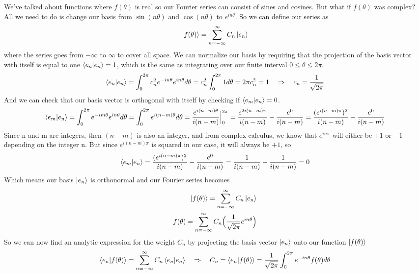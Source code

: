 \documentclass{article}
\newcommand{\be}{\begin{equation}}
\newcommand{\ee}{\end{equation}}
\begin{document}
We've talked about functions where $f(\theta)$ is real so our Fourier series can consist of sines and cosines.
But what if $f(\theta)$ was complex?
All we need to do is change our basis from $\sin(n \theta)$ and $\cos(n \theta)$ to $e^{i n \theta}$.
So we can define our series as
\be
  \ket{f(\theta)} = \sum_{n= - \infty}^{\infty} C_n \ket{e_n}
\ee
where the series goes from $- \infty$ to $\infty$ to cover all space.
We can normalize our basis by requiring that the projection of the basis vector with itself is equal to one $\braket{e_n|e_n} = 1$, which is the same as integrating over our finite interval $0 \leq \theta \leq 2 \pi$.
\be
  \braket{e_n | e_n} = \int_{0}^{2 \pi} c_n^2 e^{-i n \theta} e^{i n \theta} d \theta = c_n^2 \int_{0}^{2 \pi} 1 d \theta = 2 \pi c_n^2 = 1 \quad \Rightarrow \quad c_n = \frac{1}{\sqrt{2 \pi}}
\ee
And we can check that our basis vector is orthogonal with itself by checking if $\braket{e_m|e_n} = 0$.
\be
  \braket{e_m|e_n} = \int_0^{2 \pi} e^{- i m \theta} e^{i n \theta} d \theta = \int_0^{2 \pi} e^{i (n - m) \theta} d\theta = \frac{e^{i (n - m) \theta}}{i (n - m)} \Big|_0^{2 \pi} = \frac{e^{2 i (n - m) \pi}}{i (n - m)} - \frac{e^{0}}{i (n - m)} = \frac{(e^{ i (n - m) \pi})^2}{i (n - m)} - \frac{e^{0}}{i (n - m)}
\ee
Since n and m are integers, then $(n-m)$ is also an integer, and from complex calculus, we know that $e^{i n \pi}$ will either be $+1$ or $-1$ depending on the integer n.
But since $e^{ i (n - m) \pi}$ is squared in our case, it will always be $+1$, so
\be
  \braket{e_m|e_n} = \frac{(e^{ i (n - m) \pi})^2}{i (n - m)} - \frac{e^{0}}{i (n - m)} = \frac{1}{i (n - m)} - \frac{1}{i (n - m)} = 0
\ee
Which means our basis $\ket{e_n}$ is orthonormal and our Fourier series becomes
\be
  \begin{split}
    \ket{f(\theta)} = \sum_{n= - \infty}^{\infty} C_n \ket{e_n} \\
    f(\theta) = \sum_{n= - \infty}^{\infty} C_n \Big( \frac{1}{\sqrt{2 \pi}} e^{i n \theta} \Big)
  \end{split}
\ee
So we can now find an analytic expression for the weight $C_n$ by projecting the basis vector $\ket{e_n}$ onto our function $\ket{f(\theta)}$
\be
  \braket{e_n|f(\theta)} = \sum_{n= - \infty}^{\infty} C_n \braket{e_n|e_n} \quad \Rightarrow \quad C_n = \braket{e_n|f(\theta)} = \frac{1}{\sqrt{2 \pi}} \int_0^{2 \pi} e^{-i n \theta} f(\theta) d \theta
\ee
\end{document}
